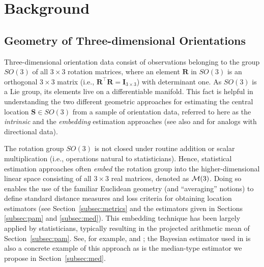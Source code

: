 \section{Background}\label{ch:bg}
\subsection{Geometry of Three-dimensional Orientations}
\label{subsec:geometry}

Three-dimensional orientation data consist of  observations belonging to the group $SO(3)$ 
of all $3\times 3$ rotation matrices, where an element $\bm R$ in $SO(3)$ is an orthogonal 
$3\times 3$ matrix (i.e., $\bm{R}^\top \bm{R}=\bm{I}_{3\times3}$) with
determinant one.  As $SO(3)$ is a Lie group, its elements live on a differentiable
manifold.  This fact is helpful in understanding the two different geometric approaches 
for estimating the central location $\bm{S} \in SO(3)$ from a sample of orientation data, referred to here 
as the \textit{intrinsic}  and  the \textit{embedding} estimation approaches (see also \citet{jupp89} and \citet{mardia00} for analogs with directional data).

The rotation group $SO(3)$ is not closed under routine addition or scalar multiplication (i.e., operations natural to statisticians). Hence, statistical estimation approaches often \textit{embed} the rotation group into the higher-dimensional linear space consisting of all $3\times 3$ real matrices, denoted as $\mathcal{M}(3)$.  Doing so enables the use of the familiar Euclidean geometry (and ``averaging'' notions) to define standard distance measures  and loss criteria for obtaining location estimators (see Section~\ref{subsec:metrics} and the estimators given in Sections \ref{subsec:pam} and \ref{subsec:med}).  This embedding technique has been largely  applied by statisticians, typically resulting in the projected arithmetic mean of Section~\ref{subsec:pam}.
See, for example, \cite{downs72, khatri77} and \cite{jupp79, jupp89}; the Bayesian estimator used in \cite{bingham10} is also a concrete example of this
approach as is the median-type estimator we propose in Section~\ref{subsec:med}.


